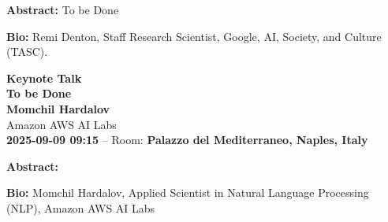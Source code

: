 \documentclass[11pt,oneside]{book}
\begin{document}
  \vspace*{0.2cm}
    \textbf{Abstract:} To be Done\\
  \newline
  
    \textbf{Bio:} Remi Denton, Staff Research Scientist, Google, AI, Society, and Culture (TASC). 
  \newpage
  \begin{center}
          {\Large \textbf{Keynote Talk}\\}
      {\LARGE \textbf{To be Done}\\}
        \vspace*{0.5cm}
    \textbf{Momchil Hardalov}\\
        Amazon AWS AI Labs\\
        
        
        \textbf{2025-09-09 09:15} -- 
                Room: \textbf{Palazzo del Mediterraneo, Naples, Italy}\\
        
  \end{center}

  \vspace*{0.2cm}
    \textbf{Abstract:} \\
  \newline
  
    \textbf{Bio:} Momchil Hardalov, Applied Scientist in Natural Language Processing (NLP), Amazon AWS AI Labs
  \newpage
  


\end{document}
